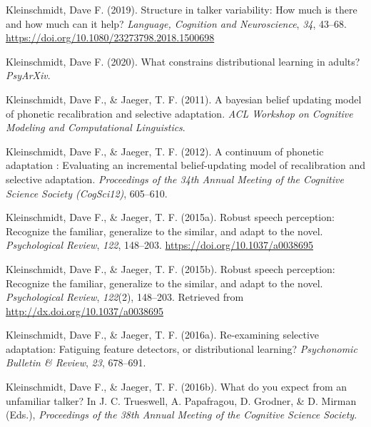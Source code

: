 \documentclass[
  11pt,
  english,
  man,floatsintext]{apa6}
\newlength{\cslhangindent}
\newlength{\cslentryspacingunit} %
\newenvironment{CSLReferences}[2] %
 {%
  \setlength{\parindent}{0pt}
  \ifodd #1
  \let\oldpar\par
  \def\par{\hangindent=\cslhangindent\oldpar}
  \fi
  \setlength{\parskip}{#2\cslentryspacingunit}
 }%
 {}
\begin{document}
\begin{CSLReferences}{1}{0}
\leavevmode{}%
Kleinschmidt, Dave F. (2019). Structure in talker variability: How much is there and how much can it help? \emph{Language, Cognition and Neuroscience}, \emph{34}, 43--68. \url{https://doi.org/10.1080/23273798.2018.1500698}

\leavevmode{}%
Kleinschmidt, Dave F. (2020). What constrains distributional learning in adults? \emph{PsyArXiv}.

\leavevmode{}%
Kleinschmidt, Dave F., \& Jaeger, T. F. (2011). A bayesian belief updating model of phonetic recalibration and selective adaptation. \emph{ACL Workshop on Cognitive Modeling and Computational Linguistics}.

\leavevmode{}%
Kleinschmidt, Dave F., \& Jaeger, T. F. (2012). A continuum of phonetic adaptation : Evaluating an incremental belief-updating model of recalibration and selective adaptation. \emph{Proceedings of the 34th Annual Meeting of the Cognitive Science Society (CogSci12)}, 605--610.

\leavevmode{}%
Kleinschmidt, Dave F., \& Jaeger, T. F. (2015a). Robust speech perception: Recognize the familiar, generalize to the similar, and adapt to the novel. \emph{Psychological Review}, \emph{122}, 148--203. \url{https://doi.org/10.1037/a0038695}

\leavevmode{}%
Kleinschmidt, Dave F., \& Jaeger, T. F. (2015b). Robust speech perception: Recognize the familiar, generalize to the similar, and adapt to the novel. \emph{Psychological Review}, \emph{122}(2), 148--203. Retrieved from \url{http://dx.doi.org/10.1037/a0038695}

\leavevmode{}%
Kleinschmidt, Dave F., \& Jaeger, T. F. (2016a). Re-examining selective adaptation: Fatiguing feature detectors, or distributional learning? \emph{Psychonomic Bulletin \& Review}, \emph{23}, 678--691.

\leavevmode{}%
Kleinschmidt, Dave F., \& Jaeger, T. F. (2016b). What do you expect from an unfamiliar talker? In J. C. Trueswell, A. Papafragou, D. Grodner, \& D. Mirman (Eds.), \emph{Proceedings of the 38th Annual Meeting of the Cognitive Science Society}.


\end{CSLReferences}
\end{document}
